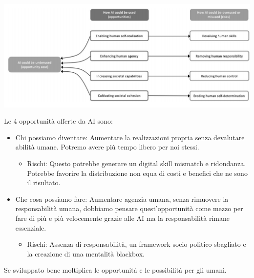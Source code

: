 \documentclass[a4page, 11pt]{article}
\begin{document}
\includegraphics[scale=0.4]{image3.png}

Le 4 opportunità offerte da AI sono:

\begin{itemize}
	\item
	Chi possiamo diventare: Aumentare la realizzazioni propria senza
	devalutare abilità umane. Potremo avere più tempo libero per noi
	stessi.
	
	\begin{itemize}
		 
		\item
		Rischi: Questo potrebbe generare un digital skill mismatch e
		ridondanza. Potrebbe favorire la distribuzione non equa di costi e
		benefici che ne sono il risultato. 
	\end{itemize}
	\item
	Che cosa possiamo fare: Aumentare agenzia umana, senza rimuovere la
	responsabilità umana, dobbiamo pensare quest'opportunità come mezzo
	per fare di più e più velocemente grazie alle AI ma la responsabilità
	rimane essenziale.
	
	\begin{itemize}
		 
		\item
		Rischi: Assenza di responsabilità, un framework socio-politico
		sbagliato e la creazione di una mentalità blackbox.
	\end{itemize}
\end{itemize}

Se sviluppato bene moltiplica le opportunità e le possibilità per gli
umani.
\end{document}
